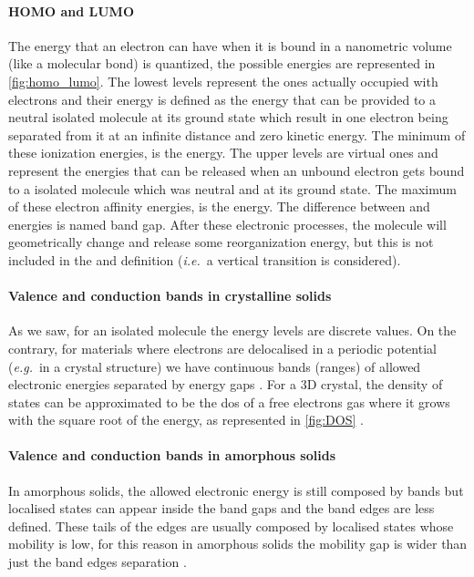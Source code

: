 		\paragraph{HOMO and LUMO}
		The energy that an electron can have when it is bound in a nanometric volume (like a molecular bond) is quantized, the possible energies are represented in \cref{fig:homo_lumo}.
		The lowest levels represent the ones actually occupied with electrons and their energy is defined as the energy that can be provided to a neutral isolated molecule at its ground state which result in one electron being separated from it at an infinite distance and zero kinetic energy.
		The minimum of these ionization energies, is the  energy.
		The upper levels are virtual ones and represent the energies that can be released when an unbound electron gets bound to a isolated molecule which was neutral and at its ground state.
		The maximum of these electron affinity energies, is the  energy.
		The difference between  and  energies is named band gap.
		After these electronic processes, the molecule will geometrically change and release some reorganization energy, but this is not included in the  and  definition (\textsl{i.e.}\ a vertical transition is considered).

		\paragraph{Valence and conduction bands in crystalline solids}
		As we saw, for an isolated molecule the energy levels are discrete values.
		On the contrary, for materials where electrons are delocalised in a periodic potential (\textsl{e.g.}\ in a crystal structure) we have continuous bands (ranges) of allowed electronic energies separated by energy gaps \cite{WikipediaPeriodic}.
		For a 3D crystal, the density of states can be approximated to be the \gls{dos} of a free electrons gas where it grows with the square root of the energy, as represented in \cref{fig:DOS} \cite[140]{Kittel2004}.

		\paragraph{Valence and conduction bands in amorphous solids}
		In amorphous solids, the allowed electronic energy is still composed by bands but localised states can appear inside the band gaps and the band edges are less defined.
		These tails of the edges are usually composed by localised states whose mobility is low, for this reason in amorphous solids the mobility gap is wider than just the band edges separation \cite[213]{Stenzel2005}.

